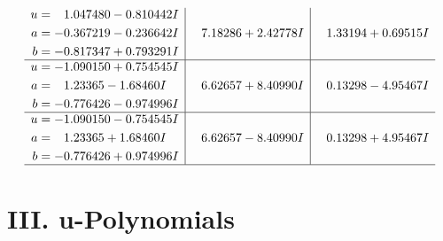 \documentclass[1p]{elsarticle_modified}
\theoremstyle{definition}
\begin{document}
$$\begin{array}{c|c|c}
\begin{aligned}
u &= \phantom{-}1.047480 - 0.810442 I \\
a &= -0.367219 - 0.236642 I \\
b &= -0.817347 + 0.793291 I\end{aligned}
 & \phantom{-}7.18286 + 2.42778 I & \phantom{-}1.33194 + 0.69515 I \\ \hline\begin{aligned}
u &= -1.090150 + 0.754545 I \\
a &= \phantom{-}1.23365 - 1.68460 I \\
b &= -0.776426 - 0.974996 I\end{aligned}
 & \phantom{-}6.62657 + 8.40990 I & \phantom{-}0.13298 - 4.95467 I \\ \hline\begin{aligned}
u &= -1.090150 - 0.754545 I \\
a &= \phantom{-}1.23365 + 1.68460 I \\
b &= -0.776426 + 0.974996 I\end{aligned}
 & \phantom{-}6.62657 - 8.40990 I & \phantom{-}0.13298 + 4.95467 I\\
 \hline 
 \end{array}$$\newpage
\newpage\renewcommand{\arraystretch}{1}
\centering \section*{ III. u-Polynomials}
\end{document}
